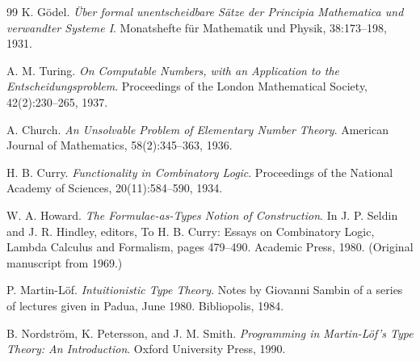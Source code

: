 \documentclass[11pt]{article}
\theoremstyle{definition}
\begin{document}
\begin{thebibliography}{99}
K. Gödel.
\textit{Über formal unentscheidbare Sätze der Principia Mathematica und verwandter Systeme I}.
Monatshefte für Mathematik und Physik, 38:173--198, 1931.

A. M. Turing.
\textit{On Computable Numbers, with an Application to the Entscheidungsproblem}.
Proceedings of the London Mathematical Society, 42(2):230--265, 1937.

A. Church.
\textit{An Unsolvable Problem of Elementary Number Theory}.
American Journal of Mathematics, 58(2):345--363, 1936.

H. B. Curry.
\textit{Functionality in Combinatory Logic}.
Proceedings of the National Academy of Sciences, 20(11):584--590, 1934.

W. A. Howard.
\textit{The Formulae-as-Types Notion of Construction}.
In J. P. Seldin and J. R. Hindley, editors, To H. B. Curry: Essays on Combinatory Logic, Lambda Calculus and Formalism, pages 479--490. Academic Press, 1980.
(Original manuscript from 1969.)

P. Martin-Löf.
\textit{Intuitionistic Type Theory}.
Notes by Giovanni Sambin of a series of lectures given in Padua, June 1980. Bibliopolis, 1984.

B. Nordström, K. Petersson, and J. M. Smith.
\textit{Programming in Martin-Löf's Type Theory: An Introduction}.
Oxford University Press, 1990.

\end{thebibliography}
\end{document}
